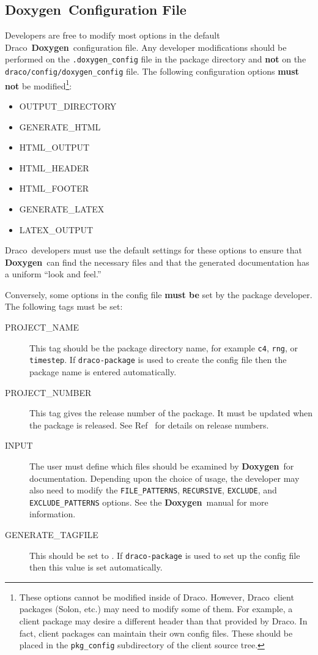 \documentclass[11pt]{nmemo}
\newcommand{\draco}{{\normalfont\sffamily Draco}}
\newcommand{\solon}{{\normalfont\sffamily Solon}}
\newcommand{\doxy}{{\normalfont\bfseries Doxygen}}
\begin{document}
\subsection{\doxy\ Configuration File}

Developers are free to modify most options in the default \draco\ 
\doxy\ configuration file.  Any developer modifications should be
performed on the \texttt{.doxygen\_config} file in the package
directory and {\bf not} on the \texttt{draco/config/doxygen\_config}
file.  The following configuration options {\bf must not} be
modified\footnote{These options cannot be modified inside of \draco.
  However, \draco\ client packages (\solon, etc.) may need to modify
  some of them.  For example, a client package may desire a different
  header than that provided by \draco.  In fact, client packages can
  maintain their own config files.  These should be placed in the
  \texttt{pkg\_config} subdirectory of the client source tree.}:
\begin{itemize}
  \ttfamily
\item OUTPUT\_DIRECTORY
\item GENERATE\_HTML
\item HTML\_OUTPUT
\item HTML\_HEADER
\item HTML\_FOOTER
\item GENERATE\_LATEX
\item LATEX\_OUTPUT
\end{itemize}
\draco\ developers must use the default settings for these options to
ensure that \doxy\ can find the necessary files and that the generated 
documentation has a uniform ``look and feel.''

Conversely, some options in the config file {\bf must be} set by the
package developer.  The following tags must be set:
\begin{description}

\item[\ttfamily PROJECT\_NAME] This tag should be the package
  directory name, for example \texttt{c4}, \texttt{rng}, or
  \texttt{timestep}.  If \texttt{draco-package} is used to create the
  config file then the package name is entered automatically.
  
\item[\ttfamily PROJECT\_NUMBER] This tag gives the release number of
  the package.  It must be updated when the package is released.  See
  Ref~\cite{xtm:9936} for details on release numbers.
  
\item[\ttfamily INPUT] The user must define which files should be
  examined by \doxy\ for documentation.  Depending upon the choice of
  usage, the developer may also need to modify the
  \texttt{FILE\_PATTERNS}, \texttt{RECURSIVE}, \texttt{EXCLUDE}, and
  \texttt{EXCLUDE\_PATTERNS} options.  See the \doxy\ manual for more
  information.
  
\item[\ttfamily GENERATE\_TAGFILE] This should be set to
  .  If \texttt{draco-package} is used to
  set up the config file then this value is set automatically.

\end{description}
\end{document}
